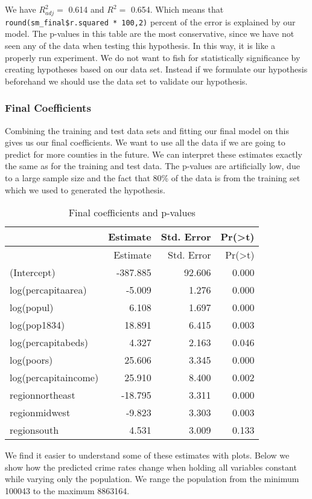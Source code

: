 \documentclass[]{article}
\begin{document}
We have \(R^2_{adj} =\) 0.614 and \(R^2 =\) 0.654. Which means that
\texttt{round(sm\_final\$r.squared\ *\ 100,2)} percent of the error is
explained by our model. The p-values in this table are the most
conservative, since we have not seen any of the data when testing this
hypothesis. In this way, it is like a properly run experiment. We do not
want to fish for statistically significance by creating hypotheses based
on our data set. Instead if we formulate our hypothesis beforehand we
should use the data set to validate our hypothesis.

\subsubsection{Final Coefficients}\label{final-coefficients}

Combining the training and test data sets and fitting our final model on
this gives us our final coefficients. We want to use all the data if we
are going to predict for more counties in the future. We can interpret
these estimates exactly the same as for the training and test data. The
p-values are artificially low, due to a large sample size and the fact
that 80\% of the data is from the training set which we used to
generated the hypothesis.

\begin{longtable}[]{@{}lrrr@{}}
\caption{Final coefficients and p-values}\tabularnewline
\toprule
& Estimate & Std. Error &
Pr(\textgreater{}\textbar{}t\textbar{})\tabularnewline
\midrule
\endfirsthead
\toprule
& Estimate & Std. Error &
Pr(\textgreater{}\textbar{}t\textbar{})\tabularnewline
\midrule
\endhead
(Intercept) & -387.885 & 92.606 & 0.000\tabularnewline
log(percapitaarea) & -5.009 & 1.276 & 0.000\tabularnewline
log(popul) & 6.108 & 1.697 & 0.000\tabularnewline
log(pop1834) & 18.891 & 6.415 & 0.003\tabularnewline
log(percapitabeds) & 4.327 & 2.163 & 0.046\tabularnewline
log(poors) & 25.606 & 3.345 & 0.000\tabularnewline
log(percapitaincome) & 25.910 & 8.400 & 0.002\tabularnewline
regionnortheast & -18.795 & 3.311 & 0.000\tabularnewline
regionmidwest & -9.823 & 3.303 & 0.003\tabularnewline
regionsouth & 4.531 & 3.009 & 0.133\tabularnewline
\bottomrule
\end{longtable}

We find it easier to understand some of these estimates with plots.
Below we show how the predicted crime rates change when holding all
variables constant while varying only the population. We range the
population from the minimum 100043 to the maximum 8863164.
\end{document}
